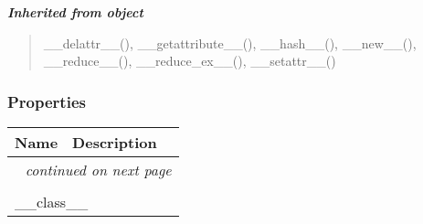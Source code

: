 \large{\textbf{\textit{Inherited from object}}}

\begin{quote}
\_\_delattr\_\_(), \_\_getattribute\_\_(), \_\_hash\_\_(), \_\_new\_\_(), \_\_reduce\_\_(), \_\_reduce\_ex\_\_(), \_\_setattr\_\_()
\end{quote}


  \subsubsection{Properties}

    \vspace{-1cm}
\hspace{\varindent}\begin{longtable}{|p{\varnamewidth}|p{\vardescrwidth}|l}
\cline{1-2}
\cline{1-2} \centering \textbf{Name} & \centering \textbf{Description}& \\
\cline{1-2}
\endhead\cline{1-2}\multicolumn{3}{r}{\small\textit{continued on next page}}\\\endfoot\cline{1-2}
\endlastfoot\multicolumn{2}{|l|}{\textit{Inherited from object}}\\
\multicolumn{2}{|p{\varwidth}|}{\raggedright \_\_class\_\_}\\
\cline{1-2}
\end{longtable}

